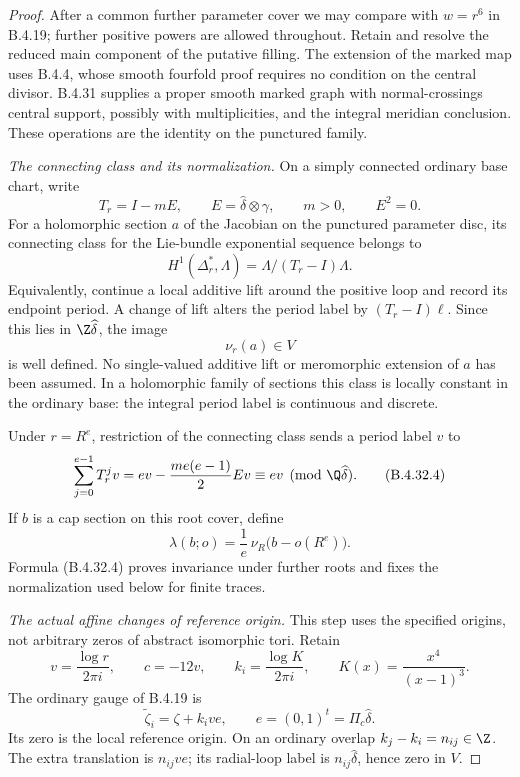 \begin{proof}
After a common further parameter cover we may compare with
$w=r^6$ in B.4.19; further positive powers are allowed throughout.
Retain and resolve the reduced main component of the putative
filling. The extension of the marked map uses B.4.4, whose
smooth fourfold proof requires no condition on the central
divisor. B.4.31 supplies a proper smooth marked graph with
normal-crossings central support, possibly with multiplicities,
and the integral meridian conclusion. These operations are
the identity on the punctured family.

\emph{The connecting class and its normalization.}
On a simply connected ordinary base chart, write
\[
 T_r=I-mE,\qquad
 E=\widehat\delta\otimes\gamma,\qquad m>0,\qquad E^2=0.
 \tag{B.4.32.2}
\]
For a holomorphic section $a$ of the Jacobian on the punctured
parameter disc, its connecting class for the Lie-bundle
exponential sequence belongs to
\[
 H^1(\Delta_r^*,\Lambda)
       =\Lambda/(T_r-I)\Lambda .
\]
Equivalently, continue a local additive lift around the positive
loop and record its endpoint period. A change of lift alters
the period label by $(T_r-I)\ell$. Since this lies in
$\Z\widehat\delta$, the image
\[
 \nu_r(a)\in V
 \tag{B.4.32.3}
\]
is well defined. No single-valued additive lift or meromorphic
extension of $a$ has been assumed. In a holomorphic family of
sections this class is locally constant in the ordinary base:
the integral period label is continuous and discrete.

Under $r=R^e$, restriction of the connecting class sends a
period label $v$ to
\[
 \sum_{j=0}^{e-1}T_r^jv
   =ev-\frac{me(e-1)}2Ev
   \equiv ev\pmod{\Q\widehat\delta}.
 \tag{B.4.32.4}
\]
If $b$ is a cap section on this root cover, define
\[
 \lambda(b;o)=\frac1e\,\nu_R\bigl(b-o(R^e)\bigr).
 \tag{B.4.32.5}
\]
Formula (B.4.32.4) proves invariance under further roots and
fixes the normalization used below for finite traces.

\emph{The actual affine changes of reference origin.}
This step uses the specified origins, not arbitrary zeros of
abstract isomorphic tori. Retain
\[
 v=\frac{\log r}{2\pi i},\qquad c=-12v,\qquad
 k_i=\frac{\log K}{2\pi i},\qquad
 K(x)=\frac{x^4}{(x-1)^3}.
\]
The ordinary gauge of B.4.19 is
\[
 \widetilde\zeta_i=\zeta+k_i v e,\qquad
 e=(0,1)^t=\Pi_c\widehat\delta .
 \tag{B.4.32.6}
\]
Its zero is the local reference origin. On an ordinary overlap
$k_j-k_i=n_{ij}\in\Z$. The extra translation is $n_{ij}ve$;
its radial-loop label is $n_{ij}\widehat\delta$, hence zero
in $V$.


\end{proof}
